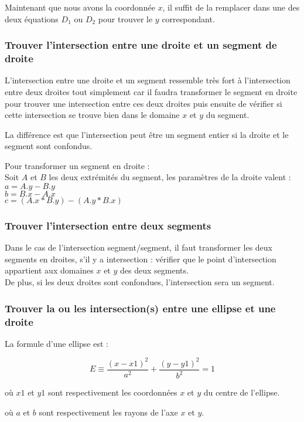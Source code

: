 \documentclass[]{report}
\begin{document}
Maintenant que nous avons la coordonnée $x$, il suffit de la remplacer
dans une des deux équations $D_1$ ou $D_2$ pour trouver le $y$ 
correspondant.

\subsubsection{Trouver l'intersection entre une droite et un segment de droite}

L'intersection entre une droite et un segment ressemble très fort
à l'intersection entre deux droites tout simplement car il faudra transformer
le segment en droite pour trouver une intersection entre ces deux droites
puis ensuite de vérifier si cette intersection se trouve bien dans le domaine
$x$ et $y$ du segment.

La différence est que l'intersection peut être un segment entier si la droite
et le segment sont confondus.

Pour transformer un segment en droite : \\
Soit $A$ et $B$ les deux extrémités du segment, les paramètres de la droite valent : 
$ a = A.y - B.y $ \\
$ b = B.x - A.x $ \\
$ c = (A.x * B.y) - (A.y * B.x) $ \\

\subsubsection{Trouver l'intersection entre deux segments}

Dans le cas de l'intersection segment/segment, il faut transformer les
deux segments en droites, s'il y a intersection : vérifier que le point
d'intersection appartient aux domaines $x$ et $y$ des deux segments. \\
De plus, si les deux droites sont confondues, l'intersection sera un segment.

\subsubsection{Trouver la ou les intersection(s) entre une ellipse et une droite}

La formule d'une ellipse est : 

$$ E \equiv \frac{(x - x1)^2}{a^2} + \frac{(y - y1)^2}{b^2} = 1 $$

\begin{description}
\item où $x1$ et $y1$ sont respectivement les coordonnées
$x$ et $y$ du centre de l'ellipse. 
\item où $a$ et $b$ sont respectivement les rayons de l'axe
$x$ et $y$. \\
\end{description}
\end{document}
